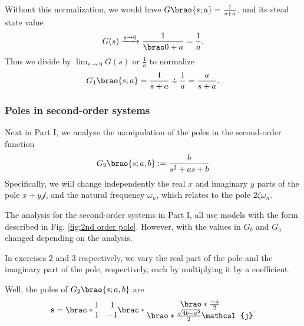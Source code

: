 \documentclass[11pt]{article}
\begin{document}
\begin{adjustwidth}{0.5in}{0in}
        Without this normalization, we would have \(G\brao{s;a} = \frac1{s + a}\), and its stead state value
        \[
            G(s) \xrightarrow{s\to0} \frac1{\brao0 + a} = \frac1a.
        \]
        Thus we divide by \(\lim_{s\to0} G(s)\) or \(\frac1a\) to normalize
        \[
            G_1\brao{s;a} = \frac{1}{s + a} \div \frac1a = \frac{a}{s + a}.
        \]

        \subsubsection{Poles in second-order systems}

        Next in Part I, we analyze the manipulation of the poles in the second-order function
        \[
            G_2\brao{s; a,b} := \frac{b}{s^2 + as + b}
        \]
        Specifically, we will change independently the real \(x\) and imaginary \(y\) parts of the pole \(x + y\mathcal{j}\), and the natural frequency \(\omega_n\), which relates to the pole \(2\zeta\omega_n\).

        The analysis for the second-order systems in Part I, all use models with the form described in Fig. \ref{fig:2nd order pole}. However, with the values in \(G_b\) and \(G_a\) changed depending on the analysis.

        In exercises 2 and 3 respectively, we vary the real part of the pole and the imaginary part of the pole, respectively, each by multiplying it by a coefficient.

        Well, the poles of \(G_2\brao{s; a,b}\) are
        \[
            \mathbf{s} = \brac*{
                \begin{matrix}
                    1 & 1 \\* 1 & -1 \\*
                \end{matrix}
            }\brac*{
                \begin{matrix}
                    \brao*{\frac{-a}{2}} \\*
                    \brao*{
                        \frac{\sqrt{4b - a^2}}{2}
                    } \mathcal{j} \\*
                \end{matrix}
            }.
        \]


\end{adjustwidth}
\end{document}
